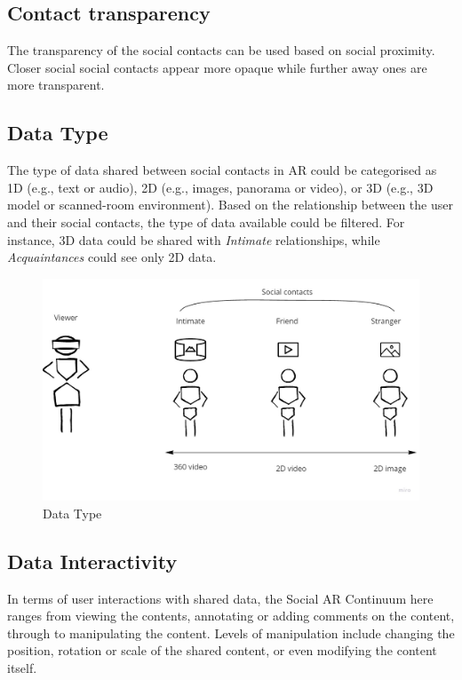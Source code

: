 \subsection{Contact transparency}

The transparency of the social contacts can be used based on social proximity. Closer social social contacts appear more opaque while further away ones are more transparent.

\subsection{Data Type}

The type of data shared between social contacts in AR could be categorised as 1D (e.g., text or audio), 2D (e.g., images, panorama or video), or 3D (e.g., 3D model or scanned-room environment). Based on the relationship between the user and their social contacts, the type of data available could be filtered. For instance, 3D data could be shared with \textit{Intimate} relationships, while \textit{Acquaintances} could see only 2D data.  

\begin{figure}[h]
    \centering
    \includegraphics[width=0.8\linewidth]{images/Continuum-Data-type.jpg}
    \caption{Data Type}
    \label{fig:continuum:data-type}
\end{figure}

\subsection{Data Interactivity}

In terms of user interactions with shared data, the Social AR Continuum here ranges from viewing the contents, annotating or adding comments on the content, through to manipulating the content. Levels of manipulation include changing the position, rotation or scale of the shared content, or even modifying the content itself.

